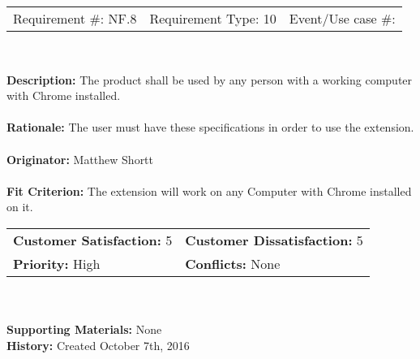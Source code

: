 \documentclass[12pt, titlepage]{article}
\begin{document}
\begin{framed}
	
	\begin{center}
		
		\begin{tabular}{ l c r }
			Requirement \#: NF.8 & Requirement Type: 10 & Event/Use case \#: \\
		\end{tabular} \\
	\end{center}
	\textbf{Description:} The product shall be used by any person with a working computer 
	with Chrome installed.\\
	\\
	\textbf{Rationale:} The user must have these specifications in order to use the 
	extension.  \\
	\\
	\textbf{Originator:} Matthew Shortt \\
	\\
	\textbf{Fit Criterion:} The extension will work on any Computer with Chrome installed on 
	it.  
	\\
	
	\begin{tabular}{ll}
		\textbf{Customer Satisfaction:} 5 & \textbf{Customer Dissatisfaction:} 5 \\
		\textbf{Priority:} High & \textbf{Conflicts:} None\\
	\end{tabular} \\
	\\
	\textbf{Supporting Materials:} None \\
	\textbf{History:} Created October 7th, 2016
	
\end{framed}
\end{document}
